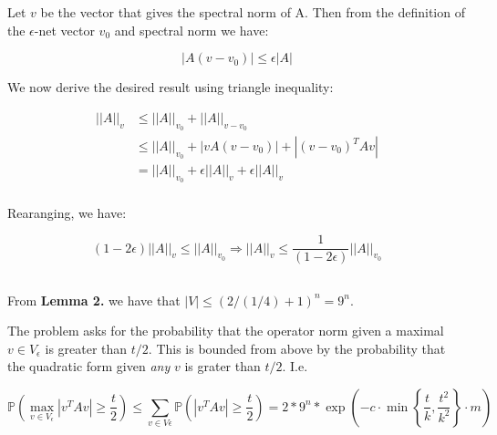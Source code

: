 \documentclass{article}
\begin{document}
Let $v$ be the vector that gives the spectral norm of A. Then from the definition of the $\epsilon$-net vector $v_0$ and spectral norm we have: 

\begin{equation}
	\left|A (v-v_0) \right|\leq \epsilon \left| A\right|
\end{equation}

We now derive the desired result using triangle inequality:


\begin{equation}
\begin{split}
	\left| \left| A \right| \right|	_{v} &\leq \left| \left| A \right| \right|_{v_0} + \left| \left| A \right| \right|_{v-v_0} \\
	&\leq \left| \left| A \right| \right|_{v_0} + |vA\left(v-v_0  \right)| + |(v-v_0)^TAv| \\
	&= \left| \left| A \right| \right|_{v_0} + \epsilon||A||_v + \epsilon||A||_v \\
\end{split}
\end{equation}

Rearanging, we have:

\begin{equation}	
	\left( 1-2\epsilon \right)\left| \left| A \right| \right|_v\leq \left| \left| A \right| \right|_{v_0} 
	\Rightarrow  
	\left| \left| A \right| \right|_v\leq \frac{1}{\left( 1-2\epsilon \right)}  \left| \left| A \right| \right|_{v_0} 
\end{equation}

\subsection{}

From \textbf{Lemma 2.} we have that $\left| V \right| \leq  \left( 2/(1/4) + 1 \right)^n = 9^n$. 

The problem asks for the probability that the operator norm given a maximal $v\in V_\epsilon$ is greater than $t/2$. 
This is bounded from above by the probability that the quadratic form given \textit{any} $v$ is grater than $t/2$. I.e.

\begin{equation}
	\mathbb{P} \left( \max_{v\in V_\epsilon} \left| v^T A v \right| \geq \frac{t}{2}\right) 
	\leq \sum_{v\in V\epsilon} \mathbb{P} \left( \left| v^T A v \right| \geq \frac{t}{2}\right) = 2 * 9^n * \exp \left( -c \cdot \min \left\{ \frac{t}{k}, \frac{t^2}{k^2}   \right\} \cdot m \right)
\end{equation}
\end{document}
